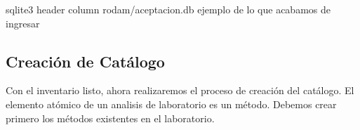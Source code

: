 \documentclass[letterpaper,10pt,spanish]{sphinxmanual}
\begin{document}
\begin{sphinxVerbatim}[commandchars=\\\{\}]
sqlite3 \PYGZhy{}header \PYGZhy{}column rodam/aceptacion.db  \PYGZsh{} ejemplo de lo que acabamos de ingresar
\end{sphinxVerbatim}

\begin{sphinxVerbatim}[commandchars=\\\{\}]
                 
    
               
                        
                            
                         
                        
                       
\end{sphinxVerbatim}


\subsection{Creación de Catálogo}
\label{\detokenize{requerimientos/laboratorio_aceptacion:creacion-de-catalogo}}
Con el inventario listo, ahora realizaremos el proceso de creación del
catálogo. El elemento atómico de un analisis de laboratorio es un
método. Debemos crear primero los métodos existentes en el laboratorio.
\end{document}
